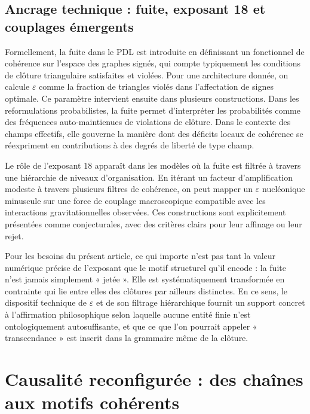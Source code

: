 \documentclass[11pt,a4paper]{article}
\theoremstyle{definition}
\begin{document}
\subsection{Ancrage technique : fuite, exposant 18 et couplages émergents}

Formellement, la fuite dans le PDL est introduite en définissant un fonctionnel de cohérence sur l’espace des graphes signés, qui compte typiquement les conditions de clôture triangulaire satisfaites et violées.\cite{Laubscher_Leakage_Probability_2024} Pour une architecture donnée, on calcule \(\varepsilon\) comme la fraction de triangles violés dans l’affectation de signes optimale. Ce paramètre intervient ensuite dans plusieurs constructions. Dans les reformulations probabilistes, la fuite permet d’interpréter les probabilités comme des fréquences auto-maintienues de violations de clôture.\cite{Laubscher_Leakage_Probability_2024} Dans le contexte des champs effectifs, elle gouverne la manière dont des déficits locaux de cohérence se réexpriment en contributions à des degrés de liberté de type champ.\cite{Laubscher_EffectiveFields_2024}

Le rôle de l’exposant \(18\) apparaît dans les modèles où la fuite est filtrée à travers une hiérarchie de niveaux d’organisation.\cite{Laubscher_Exponent18_v2_2024} En itérant un facteur d’amplification modeste à travers plusieurs filtres de cohérence, on peut mapper un \(\varepsilon\) nucléonique minuscule sur une force de couplage macroscopique compatible avec les interactions gravitationnelles observées.\cite{Laubscher_UniversalCoherenceLeakage_2024} Ces constructions sont explicitement présentées comme conjecturales, avec des critères clairs pour leur affinage ou leur rejet.\cite{Laubscher_PDL_Position_2024,Laubscher_PDL_GlobalMapping_v6_2024}

Pour les besoins du présent article, ce qui importe n’est pas tant la valeur numérique précise de l’exposant que le motif structurel qu’il encode : la fuite n’est jamais simplement « jetée ». Elle est systématiquement transformée en contrainte qui lie entre elles des clôtures par ailleurs distinctes. En ce sens, le dispositif technique de \(\varepsilon\) et de son filtrage hiérarchique fournit un support concret à l’affirmation philosophique selon laquelle aucune entité finie n’est ontologiquement autosuffisante, et que ce que l’on pourrait appeler « transcendance » est inscrit dans la grammaire même de la clôture.

\section{Causalité reconfigurée : des chaînes aux motifs cohérents}
\label{sec:causality}
\end{document}
